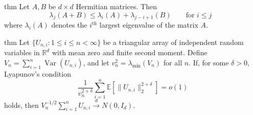 \documentclass[11pt]{article}
\begin{document}
\begin{restatable}{thm}{}  \label{thm: weyl}
    Let $A, B$ be $d\times d$ Hermitian matrices. Then
    \[\lambda_j(A+B) \leq \lambda_i(A) + \lambda_{j - i+1}(B) \qquad \text{for $i\leq j$ }\]
    where $\lambda_i(A)$ denotes the $i^{\text{th}}$ largest eigenvalue of the matrix $A$. 
\end{restatable}

\begin{restatable}{thm}{} \label{thm: lyapunov clt}
    Let $\{U_{n, i}: 1 \leq i \leq n < \infty\}$ be a triangular array of independent random variables in $\mathbb{R}^d$ with mean zero and finite second moment. Define $V_n = \sum_{i= 1}^n \operatorname{Var}(U_{n,i})$, and let $v_n^2 = \lambda_{\min}(V_n)$ for all $n$. If, for some $\delta > 0$, Lyapunov's condition
    \[\frac{1}{v_n^{2+\delta}}\sum_{i = 1}^n \mathbb{E}\left[\|U_{n, i}\|_2^{2+\delta}\right] = o(1)\]
    holds, then $V_n^{-1/2}\sum_{i = 1}^nU_{n, i} \overset{d}{\rightarrow} N(0, I_d)$.
\end{restatable}


\end{document}
